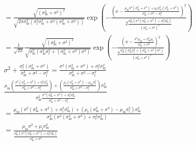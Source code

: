 \documentclass{article}\usepackage[]{graphicx}\usepackage[]{color}
\newcommand{\x}[1]{\text{#1}}
\begin{document}
\begin{landscape}
\begin{align*}
\\&=\frac{\sqrt{(\sigma_\x{m}^2+\sigma^2)^2}}{\sqrt{2\pi\sigma_\x{m}^2(\sigma_\x{f}^2\sigma_\x{m}^2+\sigma^2(\sigma_\x{m}^2+\sigma^2))}}\exp\left(-\frac{\left(x-\frac{\mu_\x{m}\sigma^2(\sigma_\x{m}^2+\sigma^2)+\mu_\x{f}\sigma_\x{m}^2(\sigma_\x{m}^2+\sigma^2)}{\sigma_\x{m}^2+\sigma^2-\sigma_\x{f}^2}\right)^2}{2\frac{\sigma_\x{m}^2(\sigma^2(\sigma_\x{m}^2+\sigma^2)+\sigma_\x{f}^2\sigma_\x{m}^2)}{(\sigma_\x{m}^2+\sigma^2)^2}}\right)
\\&=\frac{1}{\sqrt{2\pi}}\frac{\sqrt{(\sigma_\x{m}^2+\sigma^2)^2}}{\sqrt{\sigma_\x{m}^2(\sigma_\x{m}^2\sigma_\x{f}^2+(\sigma_\x{m}^2+\sigma^2)\sigma^2)}}\exp\left(-\frac{\left(x-\frac{\sigma^2\mu_\x{m}+\sigma_\x{m}^2\mu_\x{f}}{\sigma_\x{m}^2+\sigma^2}\right)^2}{2\frac{\sigma_\x{m}^2(\sigma_\x{m}^2\sigma_\x{f}^2+(\sigma_\x{m}^2+\sigma^2)\sigma^2)}{(\sigma_\x{m}^2+\sigma^2)^2}}\right)
\\&\sigma^2+\frac{\sigma_\x{f}^2(\sigma_\x{m}^2+\sigma^2)}{\sigma_\x{m}^2+\sigma^2-\sigma_\x{f}^2}=\frac{\sigma^2(\sigma_\x{m}^2+\sigma^2)+\sigma_\x{f}^2\sigma_\x{m}^2}{\sigma_\x{m}^2+\sigma^2-\sigma_\x{f}^2}
\\&\frac{\mu_\x{m}\left(\frac{\sigma^2(\sigma_\x{m}^2+\sigma^2)+\sigma_\x{f}^2\sigma_\x{m}^2}{\sigma_\x{m}^2+\sigma^2-\sigma_\x{f}^2}\right)+\left(\frac{\mu_\x{f}(\sigma_\x{m}^2+\sigma^2)-\mu_\x{m}\sigma_\x{f}^2}{\sigma_\x{m}^2+\sigma^2-\sigma_\x{f}^2}\right)\sigma_\x{m}^2}{\sigma_\x{m}^2\frac{\sigma^2(\sigma_\x{m}^2+\sigma^2)+\sigma_\x{f}^2\sigma_\x{m}^2}{\sigma_\x{m}^2+\sigma^2-\sigma_\x{f}^2}}
\\&=\frac{\mu_\x{m}(\sigma^2(\sigma_\x{m}^2+\sigma^2)+\sigma_\x{f}^2\sigma_\x{m}^2)+(\mu_\x{f}(\sigma_\x{m}^2+\sigma^2)-\mu_\x{m}\sigma_\x{f}^2)\sigma_\x{m}^2}{\sigma_\x{m}^2(\sigma^2(\sigma_\x{m}^2+\sigma^2)+\sigma_\x{f}^2\sigma_\x{m}^2)}
\\&=\frac{\mu_\x{m}\sigma^2+\mu_\x{f}\sigma_\x{m}^2}{\frac{\sigma_\x{m}^2(\sigma^2(\sigma_\x{m}^2+\sigma^2)+\sigma_\x{f}^2\sigma_\x{m}^2)}{\sigma_\x{m}^2+\sigma^2}}
\end{align*}
\end{landscape}
\end{document}
